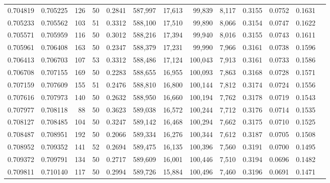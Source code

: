 \begin{tabular}{rrrrrrrrrrrrr}
0.704819 & 0.705225 &   126 &  50 &                                     0.2841 & 587,997 &  17,613 &  99,839 &   8,117 & 0.3155 & 0.0752 & 0.1631 \\
0.705233 & 0.705562 &   103 &  51 &                                     0.3312 & 588,100 &  17,510 &  99,890 &   8,066 & 0.3154 & 0.0747 & 0.1622 \\
0.705571 & 0.705959 &   116 &  50 &                                     0.3012 & 588,216 &  17,394 &  99,940 &   8,016 & 0.3155 & 0.0743 & 0.1611 \\
0.705961 & 0.706408 &   163 &  50 &                                     0.2347 & 588,379 &  17,231 &  99,990 &   7,966 & 0.3161 & 0.0738 & 0.1596 \\
0.706413 & 0.706703 &   107 &  53 &                                     0.3312 & 588,486 &  17,124 & 100,043 &   7,913 & 0.3161 & 0.0733 & 0.1586 \\
0.706708 & 0.707155 &   169 &  50 &                                     0.2283 & 588,655 &  16,955 & 100,093 &   7,863 & 0.3168 & 0.0728 & 0.1571 \\
0.707159 & 0.707609 &   155 &  51 &                                     0.2476 & 588,810 &  16,800 & 100,144 &   7,812 & 0.3174 & 0.0724 & 0.1556 \\
0.707616 & 0.707973 &   140 &  50 &                                     0.2632 & 588,950 &  16,660 & 100,194 &   7,762 & 0.3178 & 0.0719 & 0.1543 \\
0.707977 & 0.708118 &    88 &  50 &                                     0.3623 & 589,038 &  16,572 & 100,244 &   7,712 & 0.3176 & 0.0714 & 0.1535 \\
0.708127 & 0.708485 &   104 &  50 &                                     0.3247 & 589,142 &  16,468 & 100,294 &   7,662 & 0.3175 & 0.0710 & 0.1525 \\
0.708487 & 0.708951 &   192 &  50 &                                     0.2066 & 589,334 &  16,276 & 100,344 &   7,612 & 0.3187 & 0.0705 & 0.1508 \\
0.708952 & 0.709352 &   141 &  52 &                                     0.2694 & 589,475 &  16,135 & 100,396 &   7,560 & 0.3191 & 0.0700 & 0.1495 \\
0.709372 & 0.709791 &   134 &  50 &                                     0.2717 & 589,609 &  16,001 & 100,446 &   7,510 & 0.3194 & 0.0696 & 0.1482 \\
0.709811 & 0.710140 &   117 &  50 &                                     0.2994 & 589,726 &  15,884 & 100,496 &   7,460 & 0.3196 & 0.0691 & 0.1471 \\

\end{tabular}
